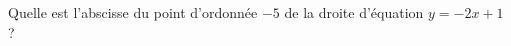 
\begin{exercice}\label{exosmath-0200}

    Quelle est l'abscisse du point d'ordonnée \( -5\) de la droite d'équation \( y=-2x+1\) ?

\end{exercice}

